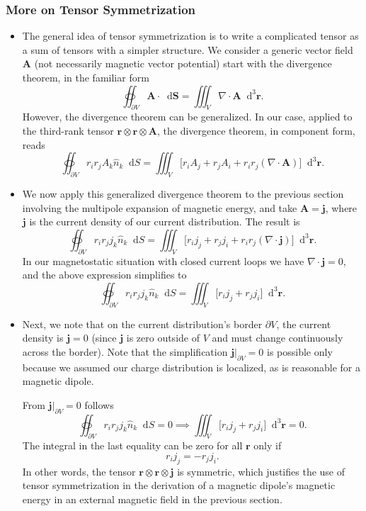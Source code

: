 \documentclass[11pt, a4paper]{article}
\newcommand{\diff}{\mathop{}\!\mathrm{d}} %
\newcommand{\dr}{\diff^{3} \r}  %
\renewcommand{\vec}[1]{\bm{#1}} %
\renewcommand{\r}{\vec{r}}
\newcommand{\A}{\vec{A}} %
\renewcommand{\j}{\vec{j}}  %
\renewcommand{\div}{\nabla \cdot}
\begin{document}
\subsubsection{More on Tensor Symmetrization}
\begin{itemize}
	\item The general idea of tensor symmetrization is to write a complicated tensor as a sum of tensors with a simpler structure. We consider a generic vector field $ \A $ (not necessarily magnetic vector potential) start with the divergence theorem, in the familiar form
	\begin{equation*}
		\oiint_{\partial V} \A \cdot \diff \vec{S} = \iiint_{V}\div \A \dr.
	\end{equation*}
	However, the divergence theorem can be generalized. In our case, applied to the third-rank tensor $ \r \otimes \r \otimes \A $, the divergence theorem, in component form, reads
	\begin{equation*}
		\oiint_{\partial V}r_{i}r_{j}A_{k}\hat{n}_{k}\diff S = \iiint_{V}\big[r_{i}A_{j} + r_{j}A_{i} + r_{i}r_{j}(\div \A)\big]\dr.
	\end{equation*}
	
	\item We now apply this generalized divergence theorem to the previous section involving the multipole expansion of magnetic energy, and take $ \A = \j $, where $ \j $ is the current density of our current distribution. The result is
	\begin{equation*}
		\oiint_{\partial V}r_{i}r_{j}j_{k}\hat{n}_{k}\diff S = \iiint_{V}\big[r_{i}j_{j} + r_{j}j_{i} + r_{i}r_{j}(\div \j)\big]\dr.
	\end{equation*}
	In our magnetostatic situation with closed current loops we have $ \div \j = 0 $, and the above expression simplifies to
	\begin{equation*}
		\oiint_{\partial V}r_{i}r_{j}j_{k}\hat{n}_{k}\diff S = \iiint_{V}\big[r_{i}j_{j} + r_{j}j_{i}\big]\dr.
	\end{equation*}
	
    \item Next, we note that on the current distribution's border $ \partial V $, the current density is $ \j = 0 $ (since $ \j $ is zero outside of $ V $ and must change continuously across the border). Note that the simplification $ \j \big|_{\partial V} = 0 $ is possible only because we assumed our charge distribution is localized, as is reasonable for a magnetic dipole. 
	 
    From $  \j \big|_{\partial V} = 0 $ follows
	\begin{equation*}
		\oiint_{\partial V}r_{i}r_{j}j_{k}\hat{n}_{k}\diff S = 0 \implies \iiint_{V}\big[r_{i}j_{j} + r_{j}j_{i}\big]\dr = 0.
	\end{equation*}
	The integral in the last equality can be zero for all $ \r $ only if
	\begin{equation*}
		r_{i}j_{j} = - r_{j}j_{i}.
	\end{equation*}
	In other words, the tensor $ \r \otimes \r \otimes \j $ is symmetric, which justifies the use of tensor symmetrization in the derivation of a magnetic dipole's magnetic energy in an external magnetic field in the previous section.
	

\end{itemize}
\end{document}
